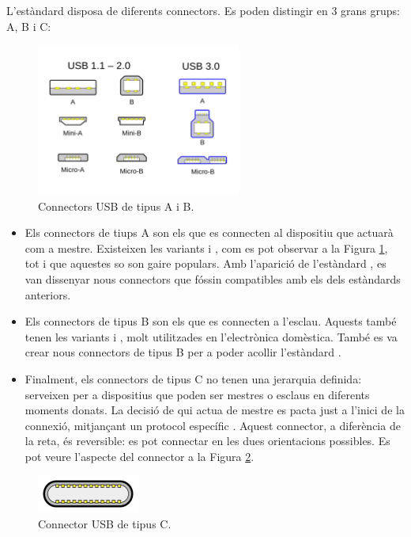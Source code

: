L'estàndard  disposa de diferents connectors. Es poden distingir en
3 grans grups: A, B i C:

\begin{figure}[ht]
    \centering
    \includegraphics[width=0.6\textwidth]{images/usb_connectors.png}
    \caption{Connectors USB de tipus A i B. \cite{Contributors2024USB}}
    \label{fig:usb_connectors}
\end{figure}

\begin{itemize}
    \item Els connectors de tiups A son els que es connecten al dispositiu
    que actuarà com a mestre. Existeixen les variants  i ,
    com es pot observar a la Figura \ref{fig:usb_connectors}, tot i que aquestes
    so son gaire populars. Amb l'aparició de l'estàndard , es van
    dissenyar nous connectors que fóssin compatibles amb els dels estàndards
    anteriors.
    \item Els connectors de tipus B son els que es connecten a l'esclau. Aquests
    també tenen les variants  i , molt utilitzades
    en l'electrònica domèstica. També es va crear nous connectors de tipus B
    per a poder acollir l'estàndard .
    \item Finalment, els connectors de tipus C no tenen una jerarquia definida:
    serveixen per a dispositius que poden ser mestres o esclaus en diferents
    moments donats. La decisió de qui actua de mestre es pacta just a l'inici
    de la connexió, mitjançant un protocol específic \cite{Axelson2015USB}.
    Aquest connector, a diferència de la reta, és reversible: es pot connectar
    en les dues orientacions possibles. Es pot veure l'aspecte del connector
    a la Figura \ref{fig:usb_connectors_c}.
\end{itemize}

\begin{figure}[ht]
    \centering
    \includegraphics[width=0.3\textwidth]{images/usb_c.png}
    \caption{Connector USB de tipus C. \cite{Contributors2024USB}}
    \label{fig:usb_connectors_c}
\end{figure}

